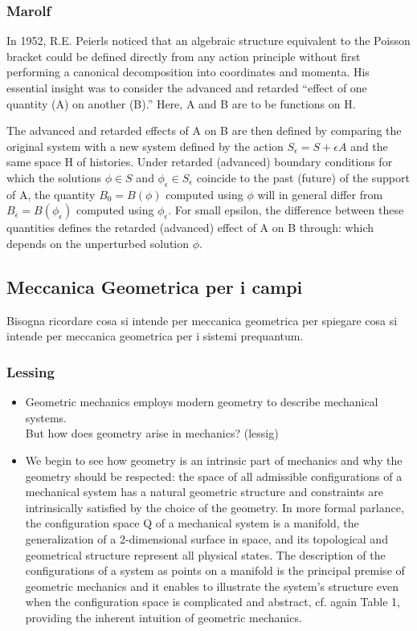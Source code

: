 \documentclass[Cascione]{subfiles}
\begin{document}
		\subsubsection{Marolf}
			In 1952, R.E. Peierls noticed that an algebraic structure equivalent to the Poisson bracket could be defined directly from any action principle without first performing a canonical decomposition into coordinates and momenta. 
			His essential insight was to consider the advanced and retarded “effect of one quantity (A) on another (B).” Here, A and B are to
be functions on H. 

			The advanced  and retarded  effects of A on B are then defined by comparing the original system with a new system defined by the action $S_\epsilon = S + \epsilon A$ and the same space H of histories. 
			Under retarded (advanced) boundary conditions for which the solutions $\phi \in S$ and $\phi_\epsilon	\in S_\epsilon$ coincide to the past (future) of the support of A, the quantity $B_0 = B(\phi)$ computed using $\phi$ will in general differ from $B_\epsilon = B(\phi_\epsilon)$ computed using $\phi_\epsilon$.
			For small epsilon, the difference between these quantities defines the retarded (advanced) effect of A on B through:
which depends on the unperturbed solution $\phi$.

	\subsection{Meccanica Geometrica per i campi}
		Bisogna ricordare cosa si intende per meccanica geometrica per spiegare cosa si intende per meccanica geometrica per i sistemi prequantum.
	
	 	\subsubsection{Lessing}
			\begin{itemize}
				\item Geometric mechanics employs modern geometry to describe mechanical systems.\\
					But how does geometry arise in mechanics?  (lessig)
				\item We begin to see how geometry is an intrinsic part of mechanics and why the geometry should be respected: the space of all admissible configurations of a mechanical system has a natural geometric structure and constraints are intrinsically satisfied by the choice of the geometry. 
				In more formal parlance, the configuration space Q of a mechanical system is a manifold, the generalization of a 2-dimensional surface in space, and its topological and geometrical structure represent all physical states.
				The description of the configurations of a system as points on a manifold is the principal premise of geometric mechanics and it enables to illustrate the system’s structure even when the configuration space is complicated and abstract, cf. again Table 1, providing the inherent intuition of geometric mechanics.
			\end{itemize}
			
\end{document}
